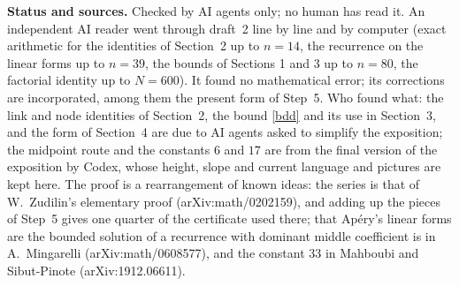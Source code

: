 \documentclass[11pt]{article}
\begin{document}
\bigskip
\noindent\textbf{Status and sources.} Checked by AI agents only; no human has read it. An
independent AI reader went through draft~2 line by line and by computer (exact arithmetic for the
identities of Section~2 up to $n=14$, the recurrence on the linear forms up to $n=39$, the bounds of
Sections 1 and 3 up to $n=80$, the factorial identity up to $N=600$). It found no mathematical
error; its corrections are incorporated, among them the present form of Step~5. Who found what:
the link and node identities of Section~2, the bound \eqref{bdd} and its use in Section~3, and the
form of Section~4 are due to AI agents asked to simplify the exposition; the midpoint route and
the constants $6$ and $17$ are from the final version of the exposition by Codex, whose height,
slope and current language and pictures are kept here. The proof is a rearrangement of known
ideas: the series is that of W.~Zudilin's elementary proof (arXiv:math/0202159), and adding up the
pieces of Step~5 gives one quarter of the certificate used there; that Ap\'ery's linear forms are
the bounded solution of a recurrence with dominant middle coefficient is in A.~Mingarelli
(arXiv:math/0608577), and the constant $33$ in Mahboubi and Sibut-Pinote (arXiv:1912.06611).
\end{document}
